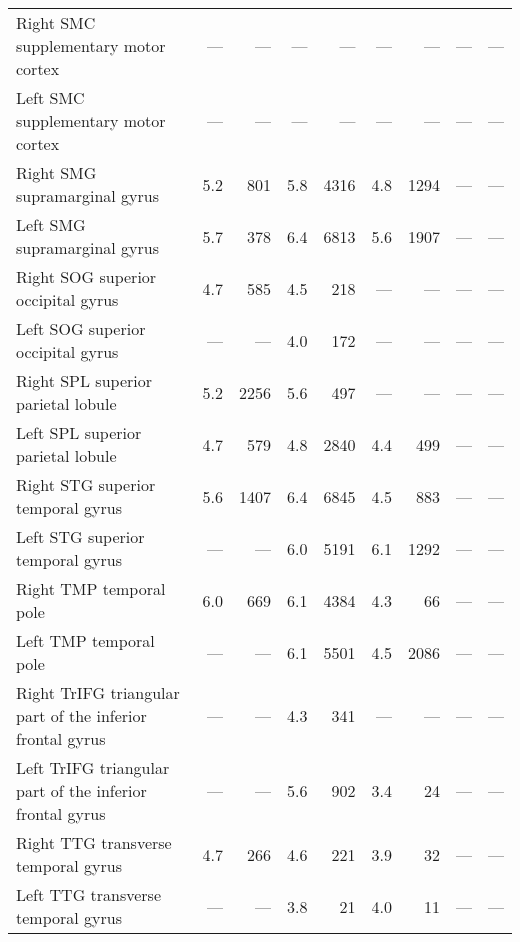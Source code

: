 \documentclass[]{article}
\begin{document}
\begin{table}[ht]
{\begin{tabular}{lrrrrrrrr}
  Right SMC   supplementary motor cortex & --- & --- & --- & --- & --- & --- & --- & --- \\ 
  Left SMC   supplementary motor cortex & --- & --- & --- & --- & --- & --- & --- & --- \\ 
  Right SMG   supramarginal gyrus & 5.2 & 801 & 5.8 & 4316 & 4.8 & 1294 & --- & --- \\ 
  Left SMG   supramarginal gyrus & 5.7 & 378 & 6.4 & 6813 & 5.6 & 1907 & --- & --- \\ 
  Right SOG   superior occipital gyrus & 4.7 & 585 & 4.5 & 218 & --- & --- & --- & --- \\ 
  Left SOG   superior occipital gyrus & --- & --- & 4.0 & 172 & --- & --- & --- & --- \\ 
  Right SPL   superior parietal lobule & 5.2 & 2256 & 5.6 & 497 & --- & --- & --- & --- \\ 
  Left SPL   superior parietal lobule & 4.7 & 579 & 4.8 & 2840 & 4.4 & 499 & --- & --- \\ 
  Right STG   superior temporal gyrus & 5.6 & 1407 & 6.4 & 6845 & 4.5 & 883 & --- & --- \\ 
  Left STG   superior temporal gyrus & --- & --- & 6.0 & 5191 & 6.1 & 1292 & --- & --- \\ 
  Right TMP   temporal pole & 6.0 & 669 & 6.1 & 4384 & 4.3 & 66 & --- & --- \\ 
  Left TMP   temporal pole & --- & --- & 6.1 & 5501 & 4.5 & 2086 & --- & --- \\ 
  Right TrIFG triangular part of the inferior frontal gyrus & --- & --- & 4.3 & 341 & --- & --- & --- & --- \\ 
  Left TrIFG triangular part of the inferior frontal gyrus & --- & --- & 5.6 & 902 & 3.4 & 24 & --- & --- \\ 
  Right TTG   transverse temporal gyrus & 4.7 & 266 & 4.6 & 221 & 3.9 & 32 & --- & --- \\ 
  Left TTG   transverse temporal gyrus & --- & --- & 3.8 & 21 & 4.0 & 11 & --- & --- \\ 
   \hline
\end{tabular}
}
\end{table}
\end{document}
